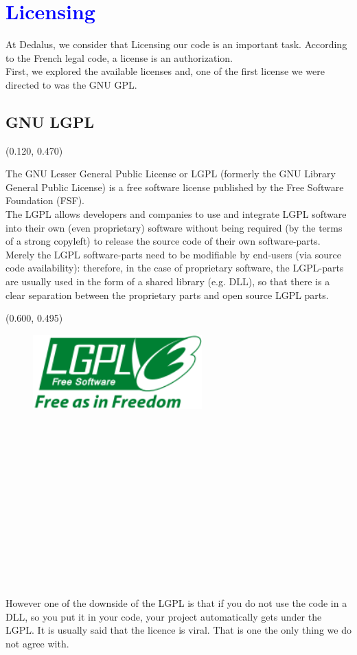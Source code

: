 \documentclass[article]{report}             %
\begin{document}
		\chapter{\textcolor{blue}{Licensing}}
			At Dedalus, we consider that Licensing our code is an important task. According to the French legal code, a license is an authorization.\\
			First, we explored the available licenses and, one of the first license we were directed to was the GNU GPL.

			\section{GNU LGPL}
\begin{textblock}{0.475}(0.120, 0.470)
				
The GNU Lesser General Public License or LGPL (formerly the GNU Library General Public License) is a free software license published by the Free Software Foundation (FSF). \\
The LGPL allows developers and companies to use and integrate LGPL software into their own (even proprietary) software without being required (by the terms of a strong copyleft) to release the source code of their own software-parts. Merely the LGPL software-parts need to be modifiable by end-users (via source code availability): therefore, in the case of proprietary software, the LGPL-parts are usually used in the form of a shared library (e.g. DLL), so that there is a clear separation between the proprietary parts and open source LGPL parts.\\
				\end{textblock}

				\begin{textblock}{0.628}(0.600, 0.495)
					\begin{figure}
						\includegraphics[width=6.5cm]{images/LGPL.png}
					\end{figure}
				\end{textblock}
~\\~\\~\\~\\~\\~\\~\\~\\~\\~\\~\\~\\~\\
				However one of the downside of the LGPL is that if you do not use the code in a DLL, so you put it in your code, your project automatically gets under the LGPL. It is usually said that the licence is viral. That is one the only thing we do not agree with.
\end{document}
